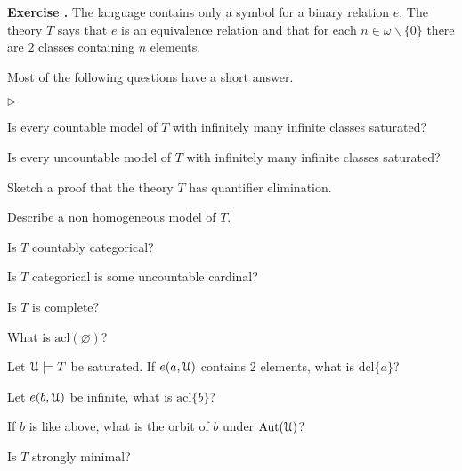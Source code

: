 \documentclass[10pt]{article}
\def\U{\EuScript U}
\def\sm{\smallsetminus}
\def\Aut{\textrm{Aut}}
\def\acl{\textrm{acl}}
\def\dcl{\textrm{dcl}}
\newcommand{\labella}[1]{{\sf\footnotesize #1}\hfill}
\renewenvironment{itemize}
  {\begin{list}{$\triangleright$}{%
   \setlength{\parskip}{0mm}
   \setlength{\topsep}{0mm}
   \setlength{\rightmargin}{0mm}
   \setlength{\listparindent}{0mm}
   \setlength{\itemindent}{0mm}
   \setlength{\labelwidth}{3ex}
   \setlength{\itemsep}{0mm}
   \setlength{\parsep}{0mm}
   \setlength{\partopsep}{0mm}
   \setlength{\labelsep}{1ex}
   \setlength{\leftmargin}{\labelwidth+\labelsep}
   \let\makelabel\labella}}{%
   \end{list}}
\newcounter{ex}
\newenvironment{exercise}{\bigskip\addtocounter{ex}{1}\textbf{Exercise \theex.\quad}}{}
\begin{document}
\begin{exercise}
The language contains only a symbol for a binary relation $e$. The theory $T$ says that $e$ is an equivalence relation and that for each $n\in\omega\sm\{0\}$ there are $2$ classes containing $n$ elements. 

Most of the following questions have a short answer.

\medskip
\begin{itemize}
\item[1.] Is every countable model of $T$ with infinitely many infinite classes saturated?
\item[2.] Is every uncountable model of $T$ with infinitely many infinite classes saturated?
\item[3.] Sketch a proof that the theory $T$ has quantifier elimination.
\item[4.] Describe a non homogeneous model of $T$.  
\item[5.] Is $T$ countably categorical? 
\item[6.] Is $T$ categorical is some uncountable cardinal?
\item[7.] Is $T$ is complete?
\item[8.] What is $\acl(\varnothing)$?
\item[9.] Let $\U\models T$ be saturated. If $e(a,\U)$ contains 2 elements, what is $\dcl\{a\}$?
\item[10.] Let $e(b,\U)$ be infinite, what is $\acl\{b\}$?
\item[11.] If $b$ is like above, what is the orbit of $b$ under $\Aut(\U)$?
\item[12.] Is $T$ strongly minimal?
\end{itemize}
\end{exercise}
\end{document}
